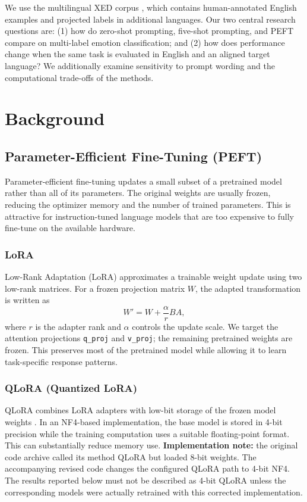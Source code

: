 \documentclass[11pt,a4paper]{article}
\begin{document}
We use the multilingual XED corpus \cite{ohman2020xed}, which contains human-annotated English examples and projected labels in additional languages. Our two central research questions are: (1) how do zero-shot prompting, five-shot prompting, and PEFT compare on multi-label emotion classification; and (2) how does performance change when the same task is evaluated in English and an aligned target language? We additionally examine sensitivity to prompt wording and the computational trade-offs of the methods.

\section{Background}
\subsection{Parameter-Efficient Fine-Tuning (PEFT)}
Parameter-efficient fine-tuning updates a small subset of a pretrained model rather than all of its parameters. The original weights are usually frozen, reducing the optimizer memory and the number of trained parameters. This is attractive for instruction-tuned language models that are too expensive to fully fine-tune on the available hardware.

\subsubsection{LoRA}
Low-Rank Adaptation (LoRA) \cite{hu2022lora} approximates a trainable weight update using two low-rank matrices. For a frozen projection matrix $W$, the adapted transformation is written as
\begin{equation}
W' = W + \frac{\alpha}{r}BA,
\end{equation}
where $r$ is the adapter rank and $\alpha$ controls the update scale. We target the attention projections \texttt{q\_proj} and \texttt{v\_proj}; the remaining pretrained weights are frozen. This preserves most of the pretrained model while allowing it to learn task-specific response patterns.

\subsubsection{QLoRA (Quantized LoRA)}
QLoRA combines LoRA adapters with low-bit storage of the frozen model weights \cite{dettmers2023qlora}. In an NF4-based implementation, the base model is stored in 4-bit precision while the training computation uses a suitable floating-point format. This can substantially reduce memory use. \textbf{Implementation note:} the original code archive called its method QLoRA but loaded 8-bit weights. The accompanying revised code changes the configured QLoRA path to 4-bit NF4. The results reported below must not be described as 4-bit QLoRA unless the corresponding models were actually retrained with this corrected implementation.
\end{document}
